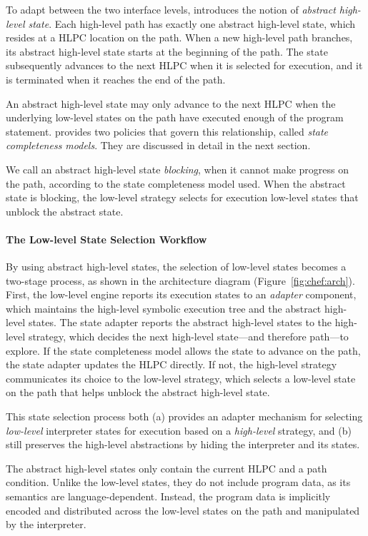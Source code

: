 To adapt between the two interface levels, \chef introduces the notion of \emph{abstract high-level state}.
%
Each high-level path has exactly one abstract high-level state, which resides at a HLPC location on the path.
%
When a new high-level path branches, its abstract high-level state starts at the beginning of the path.
%
The state subsequently advances to the next HLPC when it is selected for execution, and it is terminated when it reaches the end of the path.


An abstract high-level state may only advance to the next HLPC when the underlying low-level states on the path have executed enough of the program statement.
%
\chef provides two policies that govern this relationship, called \emph{state completeness models}.  They are discussed in detail in the next section.


We call an abstract high-level state \emph{blocking}, when it cannot make progress on the path, according to the state completeness model used.
%
When the abstract state is blocking, the low-level strategy selects for execution low-level states that unblock the abstract state.

\paragraph{The Low-level State Selection Workflow}

By using abstract high-level states, the selection of low-level states becomes a two-stage process, as shown in the architecture diagram (Figure~\ref{fig:chef:arch}).
%
First, the low-level engine reports its execution states to an \emph{adapter} component, which maintains the high-level symbolic execution tree and the abstract high-level states.
%
The state adapter reports the abstract high-level states to the high-level strategy, which decides the next high-level state---and therefore path---to explore.
%
If the state completeness model allows the state to advance on the path, the state adapter updates the HLPC directly.
%
If not, the high-level strategy communicates its choice to the low-level strategy, which selects a low-level state on the path that helps unblock the abstract high-level state.


This state selection process both (a) provides an adapter mechanism for selecting \emph{low-level} interpreter states for execution based on a \emph{high-level} strategy, and (b) still preserves the high-level abstractions by hiding the interpreter and its states.


The abstract high-level states only contain the current HLPC and a path condition.
%
Unlike the low-level states, they do not include program data, as its semantics are language-dependent.
%
Instead, the program data is implicitly encoded and distributed across the low-level states on the path and manipulated by the interpreter.

